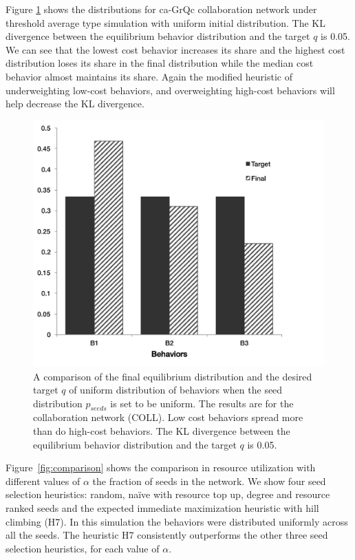 \documentclass[letterpaper]{article}
\theoremstyle{plain} 		\newtheorem{thm}{Theorem}[section]
\theoremstyle{definition} 	\newtheorem{defn}[thm]{Definition}
\theoremstyle{remark}		\newtheorem{rem}{Remark}
\begin{document}
Figure \ref{fig:snap-uniform} shows the distributions for ca-GrQc collaboration network under threshold average type simulation with uniform initial distribution.  The KL divergence between the equilibrium behavior distribution and the target $q$ is 0.05. We can see that the lowest cost behavior increases its share and the highest cost distribution loses its share in the final distribution while the median cost behavior almost maintains its share.  Again the modified heuristic of underweighting low-cost behaviors, and overweighting high-cost behaviors will help decrease the KL divergence.

\begin{figure}[htb]
\begin{centering}
\includegraphics[width=\columnwidth]{coll-dist}
\par\end{centering}
\caption{A comparison of the final equilibrium distribution and the desired target $q$ of uniform distribution of behaviors when the seed distribution $p_{seeds}$ is set to be uniform. The results are for the collaboration network (COLL). Low cost behaviors spread more than do high-cost behaviors. The KL divergence between the equilibrium behavior distribution and the target $q$ is 0.05.}\label{fig:snap-uniform}
\end{figure}

Figure~\ref{fig:comparison} shows the comparison in resource utilization with different values of $\alpha$ the fraction of seeds in the network. We show four seed selection heuristics: random, na\"ive with resource top up, degree and resource ranked seeds and the expected immediate maximization heuristic with hill climbing (H7). In this simulation the behaviors were distributed uniformly across all the seeds. The heuristic H7 consistently outperforms the other three seed selection heuristics, for each value of $\alpha$.  
\end{document}
